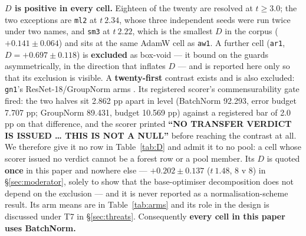 \documentclass[10pt,letterpaper]{article}
\newcommand{\Dstat}{D}                         %
\newcommand{\arm}[1]{\texttt{#1}}
\begin{document}
\textbf{$\Dstat$ is positive in every cell.} Eighteen of the twenty are resolved at
$t \ge 3.0$; the two exceptions are \arm{ml2} at $t\ 2.34$, whose three independent seeds were
run twice under two names, and \arm{sm3} at $t\ 2.22$, which is the smallest $\Dstat$ in the
corpus ($+0.141 \pm 0.064$) and sits at the same AdamW cell as \arm{aw1}. A further cell (\arm{ar1}, $\Dstat = +0.697 \pm 0.118$) is
\textbf{excluded} as box-void --- it bound on the guards asymmetrically, in the direction that
inflates $\Dstat$ --- and is reported here only so that its exclusion is visible. A
\textbf{twenty-first} contrast exists and is also excluded: \arm{gn1}'s ResNet-18/GroupNorm arms
\citep{wu2018groupnorm}. Its registered scorer's commensurability gate fired: the two halves sit
2.862 pp apart in level (BatchNorm 92.293, error budget 7.707 pp; GroupNorm 89.431, budget
10.569 pp) against a registered bar of 2.0 pp on that difference, and
the scorer printed \textbf{``NO TRANSFER VERDICT IS ISSUED \ldots{} THIS IS NOT A NULL''} before
reaching the contrast at all. We therefore give it no row in Table~\ref{tab:D} and admit it to no pool: a cell whose scorer
issued no verdict cannot be a forest row or a pool member. Its $\Dstat$ is quoted \textbf{once} in
this paper and nowhere else --- $+0.202 \pm 0.137$ ($t\ 1.48$, 8 v 8) in \S\ref{sec:moderator},
solely to show that the base-optimiser decomposition does not depend on the exclusion --- and it
is never reported as a normalisation-scheme result. Its arm means are in
Table~\ref{tab:arms} and its role in the design is discussed under T7 in \S\ref{sec:threats}. Consequently \textbf{every cell in this paper uses BatchNorm.}
\end{document}
